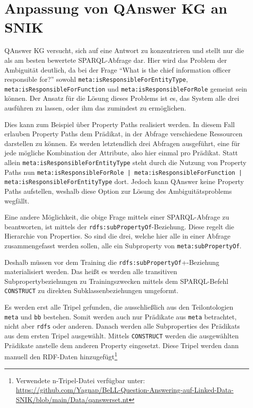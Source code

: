 \documentclass[utf8,biblatex]{lni}
\begin{document}
\section{Anpassung von QAnswer KG an SNIK}

QAnswer KG versucht, sich auf eine Antwort zu konzentrieren und stellt nur die als am besten bewertete SPARQL-Abfrage dar.
Hier wird das Problem der Ambiguität deutlich, da bei der Frage \enquote{What is the chief information officer responsible for?} sowohl
\texttt{meta:isResponsibleForEntityType}, \texttt{meta:isResponsibleForFunction} und \texttt{meta:isResponsibleForRole} gemeint sein können.
Der Ansatz für die Lösung dieses Problems ist es, das System alle drei ausführen zu lassen, oder ihm das zumindest zu ermöglichen.

Dies kann zum Beispiel über Property Paths realisiert werden.
In diesem Fall erlauben Property Paths dem Prädikat, in der Abfrage verschiedene Ressourcen darstellen zu können.
Es werden letztendlich drei Abfragen ausgeführt, eine für jede mögliche Kombination der Attribute, also hier einmal pro Prädikat.
Statt allein \texttt{meta:isResponsibleForEntityType} steht durch die Nutzung von Property Paths nun \texttt{meta:isResponsibleForRole | meta:isResponsibleForFunction | meta:isResponsibleForEntityType} dort.
Jedoch kann QAnswer keine Property Paths aufstellen, weshalb diese Option zur Lösung des Ambiguitätsproblems wegfällt.

Eine andere Möglichkeit, die obige Frage mittels einer SPARQL-Abfrage zu beantworten, ist mittels der \texttt{rdfs:subPropertyOf}-Beziehung.
Diese regelt die Hierarchie von Properties.
So sind die drei, welche hier alle in einer Abfrage zusammengefasst werden sollen, alle ein Subproperty von \texttt{meta:subPropertyOf}.

Deshalb müssen vor dem Training die \texttt{rdfs:subPropertyOf}+-Beziehung materialisiert werden.
Das heißt es werden alle transitiven Subpropertybeziehungen zu Trainingszwecken mittels dem SPARQL-Befehl \texttt{CONSTRUCT} zu direkten Subklassenbeziehungen umgeformt.

Es werden erst alle Tripel gefunden, die ausschließlich aus den Teilontologien \texttt{meta} und \texttt{bb} bestehen.
Somit werden auch nur Prädikate aus \texttt{meta} betrachtet, nicht aber \texttt{rdfs} oder anderen.
Danach werden alle Subproperties des Prädikats aus dem ersten Tripel ausgewählt.
Mittels \texttt{CONSTRUCT} werden die ausgewählten Prädikate anstelle dem anderen Property eingesetzt.
Diese Tripel werden dann manuell den RDF-Daten hinzugefügt\footnote{Verwendete n-Tripel-Datei verfügbar unter:\\\url{https://github.com/Yagnap/BeLL-Question-Answering-auf-Linked-Data-SNIK/blob/main/Data/qanswerset.nt}}
\end{document}
